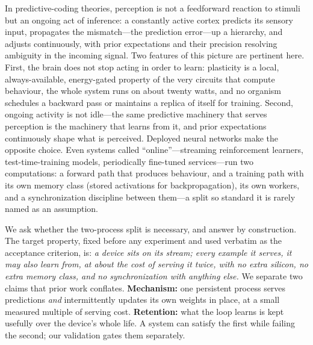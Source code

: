 \documentclass[11pt]{article}
\begin{document}
\vspace{6pt}
\noindent
In predictive-coding theories, perception is not a feedforward reaction to
stimuli but an ongoing act of inference: a constantly active cortex predicts
its sensory input, propagates the mismatch---the prediction error---up a
hierarchy, and adjusts continuously, with prior expectations and their precision
resolving ambiguity in the incoming signal\cite{rao1999predictive,friston2010free,
keller2018predictive,bastos2012canonical}. Two features of this picture are
pertinent here. First, the brain does not stop acting in order to learn:
plasticity is a local, always-available, energy-gated property of the very
circuits that compute behaviour\cite{fremaux2016neuromodulated,
lillicrap2020backpropagation}, the whole system runs on about twenty
watts\cite{attwell2001energy}, and no organism schedules a backward pass or
maintains a replica of itself for training. Second, ongoing activity is not
idle---the same predictive machinery that serves perception is the machinery
that learns from it, and prior expectations continuously shape what is
perceived\cite{flounders2019neural}. Deployed neural networks make the opposite
choice. Even systems called ``online''---streaming reinforcement learners,
test-time-training models, periodically fine-tuned services---run two
computations: a forward path that produces behaviour, and a training path with
its own memory class (stored activations for backpropagation), its own workers,
and a synchronization discipline between them\cite{espeholt2018impala,
horgan2018distributed,sun2020test,elsayed2024streaming}---a split so standard it
is rarely named as an assumption.

We ask whether the two-process split is necessary, and answer by construction.
The target property, fixed before any experiment and used verbatim as the
acceptance criterion, is: \emph{a device sits on its stream; every example it
serves, it may also learn from, at about the cost of serving it twice, with no
extra silicon, no extra memory class, and no synchronization with anything
else.} We separate two claims that prior work conflates. \textbf{Mechanism:}
one persistent process serves predictions \emph{and} intermittently updates its
own weights in place, at a small measured multiple of serving cost.
\textbf{Retention:} what the loop learns is kept usefully over the device's
whole life. A system can satisfy the first while failing the second; our
validation gates them separately.
\end{document}
